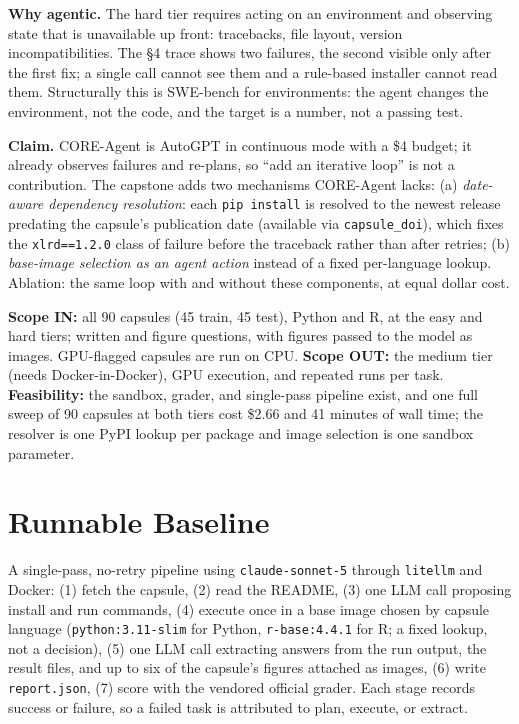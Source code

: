\documentclass[10pt]{article}
\begin{document}
\textbf{Why agentic.} The hard tier requires acting on an environment and observing state that is unavailable up front: tracebacks, file layout, version incompatibilities. The \S4 trace shows two failures, the second visible only after the first fix; a single call cannot see them and a rule-based installer cannot read them. Structurally this is SWE-bench for environments: the agent changes the environment, not the code, and the target is a number, not a passing test.

\textbf{Claim.} CORE-Agent is AutoGPT in continuous mode with a \$4 budget; it already observes failures and re-plans, so ``add an iterative loop'' is not a contribution. The capstone adds two mechanisms CORE-Agent lacks: (a) \emph{date-aware dependency resolution}: each \texttt{pip install} is resolved to the newest release predating the capsule's publication date (available via \texttt{capsule\_doi}), which fixes the \texttt{xlrd==1.2.0} class of failure before the traceback rather than after retries; (b) \emph{base-image selection as an agent action} instead of a fixed per-language lookup. Ablation: the same loop with and without these components, at equal dollar cost.

\textbf{Scope IN:} all 90 capsules (45 train, 45 test), Python and R, at the easy and hard tiers; written and figure questions, with figures passed to the model as images. GPU-flagged capsules are run on CPU. \textbf{Scope OUT:} the medium tier (needs Docker-in-Docker), GPU execution, and repeated runs per task. \textbf{Feasibility:} the sandbox, grader, and single-pass pipeline exist, and one full sweep of 90 capsules at both tiers cost \$2.66 and 41 minutes of wall time; the resolver is one PyPI lookup per package and image selection is one sandbox parameter.

\section{Runnable Baseline}
A single-pass, no-retry pipeline using \texttt{claude-sonnet-5} through \texttt{litellm} and Docker: (1) fetch the capsule, (2) read the README, (3) one LLM call proposing install and run commands, (4) execute once in a base image chosen by capsule language (\texttt{python:3.11-slim} for Python, \texttt{r-base:4.4.1} for R; a fixed lookup, not a decision), (5) one LLM call extracting answers from the run output, the result files, and up to six of the capsule's figures attached as images, (6) write \texttt{report.json}, (7) score with the vendored official grader. Each stage records success or failure, so a failed task is attributed to plan, execute, or extract.
\end{document}
